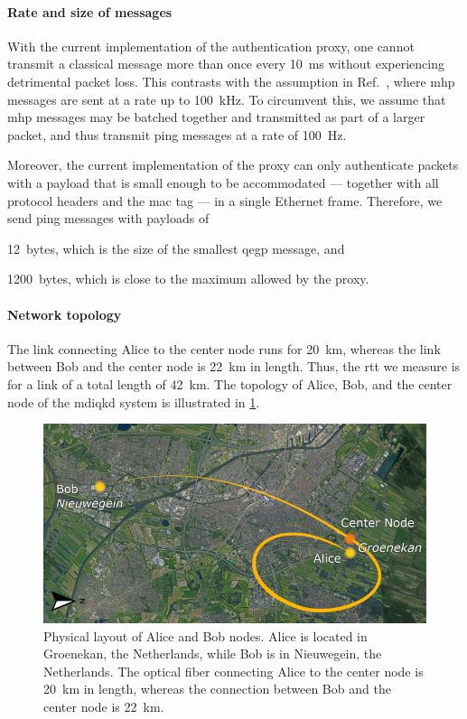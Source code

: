 \paragraph{Rate and size of messages}

With the current implementation of the authentication proxy, one cannot transmit a classical message
more than once every \qty{10}{\ms} without experiencing detrimental packet loss. This contrasts with
the assumption in Ref.~\cite{dahlberg_2019_egp}, where \acrshort{mhp} messages are sent at a rate up
to \qty{100}{\kHz}. To circumvent this, we assume that \acrshort{mhp} messages may be batched
together and transmitted as part of a larger packet, and thus transmit ping messages at a rate of
\qty{100}{\Hz}.

Moreover, the current implementation of the proxy can only authenticate packets with a payload that
is small enough to be accommodated --- together with all protocol headers and the \acrshort{mac} tag
--- in a single Ethernet frame. Therefore, we send ping messages with payloads of
%
\begin{inlinelist}
    \item \num{12}~bytes, which is the size of the smallest \acrshort{qegp} message, and
    \item \num{1200}~bytes, which is close to the maximum allowed by the proxy.
\end{inlinelist}

\paragraph{Network topology}

The link connecting Alice to the center node runs for \qty{20}{\km}, whereas the link between Bob
and the center node is \qty{22}{\km} in length. Thus, the \acrshort{rtt} we measure is for a link of
a total length of \qty{42}{\km}. The topology of Alice, Bob, and the center node of the
\acrshort{mdiqkd} system is illustrated in \cref{fig:mac-setup-qkd-locations}.

\begin{figure}[t]
    \centering
    \includegraphics[width=0.6\linewidth]{figures/mac-setup-qkd-locations-resized.png}
    \caption{
        Physical layout of Alice and Bob nodes. Alice is located in Groenekan, the Netherlands,
        while Bob is in Nieuwegein, the Netherlands. The optical fiber connecting Alice to the
        center node is \qty{20}{\km} in length, whereas the connection between Bob and the center
        node is \qty{22}{\km}.
    }
    \label{fig:mac-setup-qkd-locations}
\end{figure}

